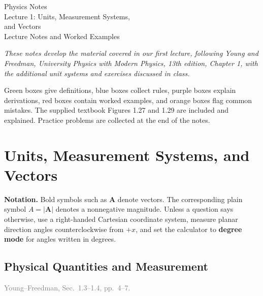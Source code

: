 \documentclass[11pt,letterpaper]{article}
\newcommand{\vect}[1]{\boldsymbol{#1}}
\newcommand{\bookref}[2]{\textcolor{gray}{\footnotesize Young--Freedman, Sec.~#1, pp.~#2.}}
\begin{document}
\hypersetup{pageanchor=false}
\begin{titlepage}
\thispagestyle{empty}
\begin{center}
\vspace*{0.8cm}
{\color{boxblue}\fontsize{24.88}{30}\selectfont Physics Notes}\\[0.4cm]
{\color{boxblue}\Large Lecture 1: Units, Measurement Systems,\\[0.12cm] and Vectors}\\[0.5cm]
{\large  Lecture Notes and Worked Examples}\\[0.6cm]
\begin{minipage}{0.86\textwidth}
\centering\itshape
These notes develop the material covered in our first lecture, following Young and Freedman, \emph{University Physics with Modern Physics}, 13th edition, Chapter 1, with the additional unit systems and exercises discussed in class.

\medskip
Green boxes give definitions, blue boxes collect rules, purple boxes explain derivations, red boxes contain worked examples, and orange boxes flag common mistakes. The supplied textbook Figures 1.27 and 1.29 are included and explained. Practice problems are collected at the end of the notes.
\end{minipage}
\end{center}
\vfill
\tableofcontents
\thispagestyle{empty}
\end{titlepage}
\hypersetup{pageanchor=true}

\section{Units, Measurement Systems, and Vectors}
\begin{topicsbox}

\medskip
\textbf{Notation.} Bold symbols such as $\vect A$ denote vectors. The corresponding plain symbol $A=|\vect A|$ denotes a nonnegative magnitude. Unless a question says otherwise, use a right-handed Cartesian coordinate system, measure planar direction angles counterclockwise from $+x$, and set the calculator to \textbf{degree mode} for angles written in degrees.
\end{topicsbox}

\subsection{Physical Quantities and Measurement}
\bookref{1.3--1.4}{4--7}
\end{document}
